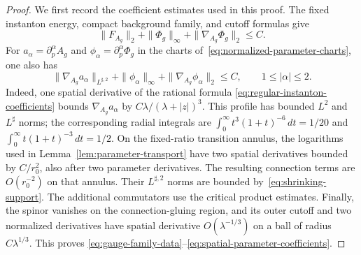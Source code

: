 \documentclass[11pt]{amsart}
\theoremstyle{definition}
\theoremstyle{remark}
\theoremstyle{plain}
\begin{document}
\begin{proof}
We first record the coefficient estimates used in this proof.  The fixed
instanton energy, compact background family, and cutoff formulas give
\begin{equation}\label{eq:gauge-family-data}
 \|F_{A_g}\|_2+\|\Phi_g\|_\infty+
 \|\nabla_{A_g}\Phi_g\|_2\leq C.
\end{equation}
For $a_\alpha=\partial_p^\alpha A_g$ and
$\phi_\alpha=\partial_p^\alpha\Phi_g$ in the charts
of~\eqref{eq:normalized-parameter-charts}, one also has
\begin{equation}\label{eq:spatial-parameter-coefficients}
 \|\nabla_{A_g}a_\alpha\|_{L^{\sharp,2}}
 +\|\phi_\alpha\|_\infty+\|\nabla_{A_g}\phi_\alpha\|_2
 \leq C,\qquad 1\leq|\alpha|\leq2.
\end{equation}
Indeed, one spatial derivative of the rational formula
\eqref{eq:regular-instanton-coefficients} bounds
$\nabla_{A_g}a_\alpha$ by $C\lambda/(\lambda+|z|)^3$.
This profile has bounded $L^2$ and $L^\sharp$ norms; the corresponding
radial integrals are
$\int_0^\infty t^3(1+t)^{-6}\,dt=1/20$ and
$\int_0^\infty t(1+t)^{-3}\,dt=1/2$.
On the fixed-ratio transition annulus, the logarithms used in
Lemma~\ref{lem:parameter-transport} have two spatial derivatives
bounded by $C/r_0^2$, also after two parameter derivatives.
The resulting connection terms are $O(r_0^{-2})$ on that annulus.
Their $L^{\sharp,2}$ norms are bounded
by~\eqref{eq:shrinking-support}.  The additional commutators use the
critical product estimates.  Finally, the spinor vanishes on the
connection-gluing region, and its outer cutoff and two normalized
derivatives have spatial derivative $O(\lambda^{-1/3})$ on a ball of
radius $C\lambda^{1/3}$.  This proves
\eqref{eq:gauge-family-data}--\eqref{eq:spatial-parameter-coefficients}.


\end{proof}
\end{document}
